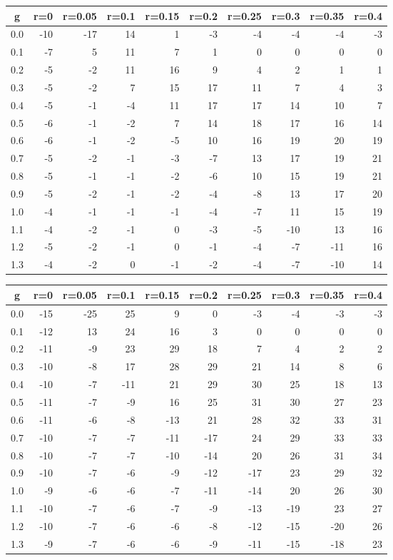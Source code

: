 %
\begin{table}[!tbp]
 \begin{center}
 \begin{tabular}{rrrrrrrrrr}\hline\hline
\multicolumn{1}{c}{g}&\multicolumn{1}{c}{r=0}&\multicolumn{1}{c}{r=0.05}&\multicolumn{1}{c}{r=0.1}&\multicolumn{1}{c}{r=0.15}&\multicolumn{1}{c}{r=0.2}&\multicolumn{1}{c}{r=0.25}&\multicolumn{1}{c}{r=0.3}&\multicolumn{1}{c}{r=0.35}&\multicolumn{1}{c}{r=0.4}\tabularnewline
\hline
0.0&-10&-17&14& 1&-3&-4& -4& -4&-3\tabularnewline
0.1& -7&  5&11& 7& 1& 0&  0&  0& 0\tabularnewline
0.2& -5& -2&11&16& 9& 4&  2&  1& 1\tabularnewline
0.3& -5& -2& 7&15&17&11&  7&  4& 3\tabularnewline
0.4& -5& -1&-4&11&17&17& 14& 10& 7\tabularnewline
0.5& -6& -1&-2& 7&14&18& 17& 16&14\tabularnewline
0.6& -6& -1&-2&-5&10&16& 19& 20&19\tabularnewline
0.7& -5& -2&-1&-3&-7&13& 17& 19&21\tabularnewline
0.8& -5& -1&-1&-2&-6&10& 15& 19&21\tabularnewline
0.9& -5& -2&-1&-2&-4&-8& 13& 17&20\tabularnewline
1.0& -4& -1&-1&-1&-4&-7& 11& 15&19\tabularnewline
1.1& -4& -2&-1& 0&-3&-5&-10& 13&16\tabularnewline
1.2& -5& -2&-1& 0&-1&-4& -7&-11&16\tabularnewline
1.3& -4& -2& 0&-1&-2&-4& -7&-10&14\tabularnewline
\hline
\end{tabular}

\end{center}

\end{table}

%
\begin{table}[!tbp]
 \begin{center}
 \begin{tabular}{rrrrrrrrrr}\hline\hline
\multicolumn{1}{c}{g}&\multicolumn{1}{c}{r=0}&\multicolumn{1}{c}{r=0.05}&\multicolumn{1}{c}{r=0.1}&\multicolumn{1}{c}{r=0.15}&\multicolumn{1}{c}{r=0.2}&\multicolumn{1}{c}{r=0.25}&\multicolumn{1}{c}{r=0.3}&\multicolumn{1}{c}{r=0.35}&\multicolumn{1}{c}{r=0.4}\tabularnewline
\hline
0.0&-15&-25& 25&  9&  0& -3& -4& -3&-3\tabularnewline
0.1&-12& 13& 24& 16&  3&  0&  0&  0& 0\tabularnewline
0.2&-11& -9& 23& 29& 18&  7&  4&  2& 2\tabularnewline
0.3&-10& -8& 17& 28& 29& 21& 14&  8& 6\tabularnewline
0.4&-10& -7&-11& 21& 29& 30& 25& 18&13\tabularnewline
0.5&-11& -7& -9& 16& 25& 31& 30& 27&23\tabularnewline
0.6&-11& -6& -8&-13& 21& 28& 32& 33&31\tabularnewline
0.7&-10& -7& -7&-11&-17& 24& 29& 33&33\tabularnewline
0.8&-10& -7& -7&-10&-14& 20& 26& 31&34\tabularnewline
0.9&-10& -7& -6& -9&-12&-17& 23& 29&32\tabularnewline
1.0& -9& -6& -6& -7&-11&-14& 20& 26&30\tabularnewline
1.1&-10& -7& -6& -7& -9&-13&-19& 23&27\tabularnewline
1.2&-10& -7& -6& -6& -8&-12&-15&-20&26\tabularnewline
1.3& -9& -7& -6& -6& -9&-11&-15&-18&23\tabularnewline
\hline
\end{tabular}

\end{center}

\end{table}

